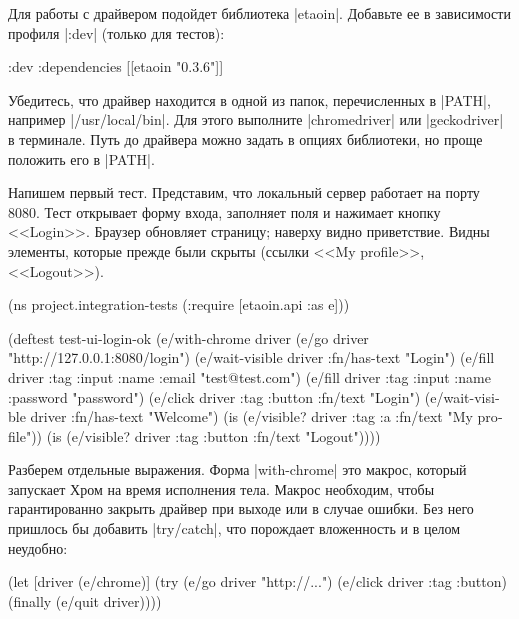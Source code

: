 Для работы с драйвером подойдет библиотека
\spverb|etaoin|. Добавьте ее в
зависимости профиля \spverb|:dev| (только для тестов):

\begin{english}
  \begin{clojure}
:dev {:dependencies [[etaoin "0.3.6"]]}
  \end{clojure}
\end{english}

Убедитесь, что драйвер находится в одной из папок, перечисленных в
\spverb|PATH|, например \spverb|/usr/local/bin|. Для этого выполните
\spverb|chromedriver| или \spverb|geckodriver| в терминале. Путь до драйвера
можно задать в опциях библиотеки, но проще положить его в \spverb|PATH|.

Напишем первый тест. Представим, что локальный сервер работает на порту
8080. Тест открывает форму входа, заполняет поля и нажимает кнопку
<<Login>>. Браузер обновляет страницу; наверху видно приветствие. Видны
элементы, которые прежде были скрыты (ссылки <<My profile>>, <<Logout>>).

\begin{english}
  \begin{clojure}
(ns project.integration-tests
  (:require [etaoin.api :as e]))

(deftest test-ui-login-ok
  (e/with-chrome {} driver
    (e/go driver "http://127.0.0.1:8080/login")
    (e/wait-visible driver {:fn/has-text "Login"})
    (e/fill driver {:tag :input :name :email} "test@test.com")
    (e/fill driver {:tag :input :name :password} "password")
    (e/click driver {:tag :button :fn/text "Login"})
    (e/wait-visible driver {:fn/has-text "Welcome"})
    (is (e/visible? driver {:tag :a :fn/text "My profile"}))
    (is (e/visible? driver {:tag :button :fn/text "Logout"}))))
  \end{clojure}
\end{english}

Разберем отдельные выражения. Форма \spverb|with-chrome| это макрос, который
запускает Хром на время исполнения тела. Макрос необходим, чтобы гарантированно
закрыть драйвер при выходе или в случае ошибки. Без него пришлось бы добавить
\spverb|try/catch|, что порождает вложенность и в целом неудобно:

\begin{english}
  \begin{clojure}
(let [driver (e/chrome)]
  (try
    (e/go driver "http://...")
    (e/click driver {:tag :button})
    (finally
      (e/quit driver))))
  \end{clojure}
\end{english}

